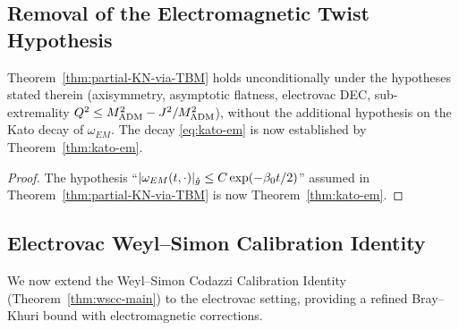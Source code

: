 \subsection{Removal of the Electromagnetic Twist Hypothesis}

\begin{corollary}\label{cor:strengthened-KN}
Theorem~\ref{thm:partial-KN-via-TBM} holds unconditionally under the hypotheses stated therein (axisymmetry, asymptotic flatness, electrovac DEC, sub-extremality $Q^2\leq M_{\mathrm{ADM}}^2 - J^2/M_{\mathrm{ADM}}^2$), without the additional hypothesis on the Kato decay of $\omega_{EM}$. The decay \eqref{eq:kato-em} is now established by Theorem~\ref{thm:kato-em}.
\end{corollary}

\begin{proof}
The hypothesis ``$|\omega_{EM}(t,\cdot)|_{\tilde{g}}\leq C\exp(-\beta_0 t/2)$'' assumed in Theorem~\ref{thm:partial-KN-via-TBM} is now Theorem~\ref{thm:kato-em}.
\end{proof}

\subsection{Electrovac Weyl--Simon Calibration Identity}

We now extend the Weyl--Simon Codazzi Calibration Identity (Theorem~\ref{thm:wscc-main}) to the electrovac setting, providing a refined Bray--Khuri bound with electromagnetic corrections.

